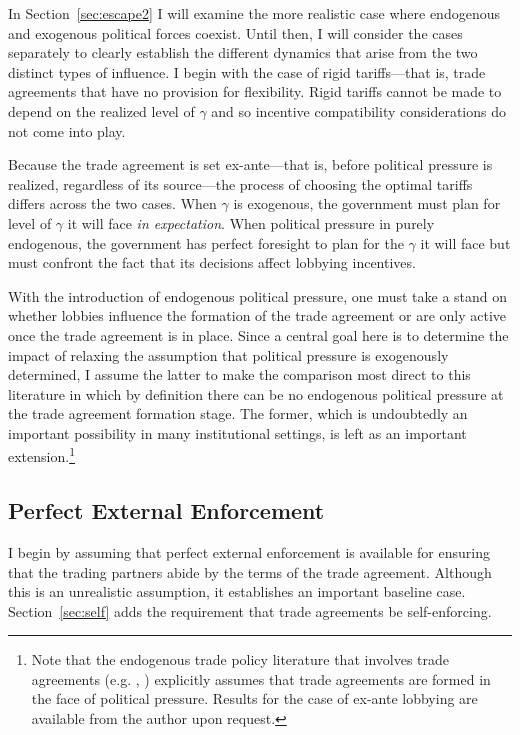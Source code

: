 \documentclass[12pt,titlepage]{article}
\newcommand{\ga}{\gamma}
\begin{document}
In Section~\ref{sec:escape2} I will examine the more realistic case where endogenous and exogenous political forces coexist. Until then, I will consider the cases separately to clearly establish the different dynamics that arise from the two distinct types of influence. I begin with the case of rigid tariffs---that is, trade agreements that have no provision for flexibility. Rigid tariffs cannot be made to depend on the realized level of $\ga$ and so incentive compatibility considerations do not come into play.

Because the trade agreement is set ex-ante---that is, before political pressure is realized, regardless of its source---the process of choosing the optimal tariffs differs across the two cases. When $\ga$ is exogenous, the government must plan for level of $\ga$ it will face \textit{in expectation}. When political pressure in purely endogenous, the government has perfect foresight to plan for the $\ga$ it will face but must confront the fact that its decisions affect lobbying incentives.

With the introduction of endogenous political pressure, one must take a stand on whether lobbies influence the formation of the trade agreement or are only active once the trade agreement is in place. Since a central goal here is to determine the impact of relaxing the assumption that political pressure is exogenously determined, I assume the latter to make the comparison most direct to this literature in which by definition there can be no endogenous political pressure at the trade agreement formation stage. The former, which is undoubtedly an important possibility in many institutional settings, is left as an important extension.\footnote{Note that the endogenous trade policy literature that involves trade agreements (e.g. \Textcite{gh95}, \Textcite{mrc2007}) explicitly assumes that trade agreements are formed in the face of political pressure. Results for the case of ex-ante lobbying are available from the author upon request.}


\subsection{Perfect External Enforcement}
\label{sec:perfect}
I begin by assuming that perfect external enforcement is available for ensuring that the trading partners abide by the terms of the trade agreement. Although this is an unrealistic assumption, it establishes an important baseline case. Section~\ref{sec:self} adds the requirement that trade agreements be self-enforcing.
\end{document}
